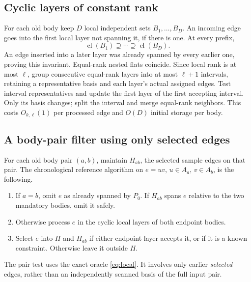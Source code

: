 \documentclass[11pt,a4paper]{article}
\theoremstyle{definition}
\theoremstyle{remark}
\begin{document}
\subsection{Cyclic layers of constant rank}

For each old body keep $D$ local independent sets
$B_1,\ldots,B_D$. An incoming edge goes into the first
local layer not spanning it, if there is one.
At every prefix,
\begin{equation}\label{eq:flat-chain}
 \operatorname{cl}(B_1)\supseteq\cdots
 \supseteq\operatorname{cl}(B_D).
\end{equation}
An edge inserted into a later layer was already spanned
by every earlier one, proving this invariant.
Equal-rank nested flats coincide. Since local rank is
at most $\ell$, group consecutive equal-rank layers
into at most $\ell+1$ intervals, retaining a representative
basis and each layer's actual assigned edges.
Test interval representatives and update the first layer
of the first accepting interval. Only its basis changes;
split the interval and merge equal-rank neighbors.
This costs $O_{k,\ell}(1)$ per processed edge and $O(D)$
initial storage per body.

\subsection{A body-pair filter using only selected edges}

For each old body pair $(a,b)$, maintain $H_{ab}$, the
selected sample edges on that pair. The chronological
reference algorithm on $e=uv$, $u\in A_a$, $v\in A_b$,
is the following.
\begin{enumerate}
 \item If $a=b$, omit $e$ as already spanned by $P_0$.
 If $H_{ab}$ spans $e$ relative to the two mandatory
 bodies, omit it safely.
 \item Otherwise process $e$ in the cyclic local layers
 of both endpoint bodies.
 \item Select $e$ into $H$ and $H_{ab}$ if either endpoint
 layer accepts it, or if it is a known constraint.
 Otherwise leave it outside $H$.
\end{enumerate}
The pair test uses the exact oracle \eqref{eq:local}.
It involves only earlier \emph{selected} edges, rather
than an independently scanned basis of the full input pair.
\end{document}
